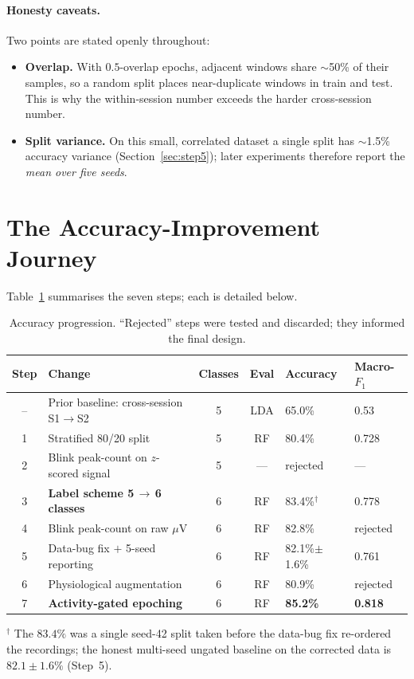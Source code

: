 \documentclass[11pt,a4paper]{article}
\newcommand{\muv}{$\mu$V}
\newcommand{\fone}{$F_1$}
\begin{document}
\paragraph{Honesty caveats.}
Two points are stated openly throughout:
\begin{itemize}[noitemsep]
  \item \textbf{Overlap.} With $0.5$-overlap epochs, adjacent windows share
  $\sim$50\% of their samples, so a random split places near-duplicate windows in
  train and test. This is why the within-session number exceeds the harder
  cross-session number.
  \item \textbf{Split variance.} On this small, correlated dataset a single split
  has $\sim$1.5\% accuracy variance (Section~\ref{sec:step5}); later experiments
  therefore report the \emph{mean over five seeds}.
\end{itemize}

\section{The Accuracy-Improvement Journey}
\label{sec:journey}
Table~\ref{tab:journey} summarises the seven steps; each is detailed below.

\begin{table}[h]
\centering
\caption{Accuracy progression. ``Rejected'' steps were tested and discarded; they
informed the final design.}
\label{tab:journey}
\small
\begin{tabular}{@{}clccll@{}}
\toprule
Step & Change & Classes & Eval & Accuracy & Macro-\fone{} \\
\midrule
-- & Prior baseline: cross-session S1$\to$S2 & 5 & LDA & 65.0\% & 0.53 \\
1 & Stratified 80/20 split & 5 & RF & 80.4\% & 0.728 \\
2 & Blink peak-count on $z$-scored signal & 5 & --- & \textcolor{bad}{rejected} & --- \\
3 & \textbf{Label scheme 5\,$\to$\,6 classes} & 6 & RF & 83.4\%$^\dagger$ & 0.778 \\
4 & Blink peak-count on raw \muv{} & 6 & RF & \textcolor{bad}{82.8\%} & rejected \\
5 & Data-bug fix $+$ 5-seed reporting & 6 & RF & 82.1\%$\pm$1.6\% & 0.761 \\
6 & Physiological augmentation & 6 & RF & \textcolor{bad}{80.9\%} & rejected \\
7 & \textbf{Activity-gated epoching} & 6 & RF & \textbf{85.2\%} & \textbf{0.818} \\
\bottomrule
\end{tabular}
\end{table}
{\footnotesize $^\dagger$ The $83.4\%$ was a single seed-42 split taken before the
data-bug fix re-ordered the recordings; the honest multi-seed ungated baseline on
the corrected data is $82.1\pm1.6\%$ (Step~5).}
\end{document}
